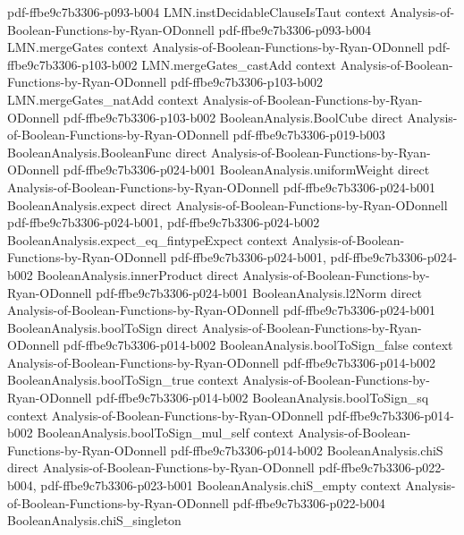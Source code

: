 \begin{lemma}
  {pdf-ffbe9c7b3306-p093-b004}
\proofstep
  {LMN.instDecidableClauseIsTaut}
  {context}
  {Analysis-of-Boolean-Functions-by-Ryan-ODonnell}
  {pdf-ffbe9c7b3306-p093-b004}
\proofstep
  {LMN.mergeGates}
  {context}
  {Analysis-of-Boolean-Functions-by-Ryan-ODonnell}
  {pdf-ffbe9c7b3306-p103-b002}
\proofstep
  {LMN.mergeGates_castAdd}
  {context}
  {Analysis-of-Boolean-Functions-by-Ryan-ODonnell}
  {pdf-ffbe9c7b3306-p103-b002}
\proofstep
  {LMN.mergeGates_natAdd}
  {context}
  {Analysis-of-Boolean-Functions-by-Ryan-ODonnell}
  {pdf-ffbe9c7b3306-p103-b002}
\proofstep
  {BooleanAnalysis.BoolCube}
  {direct}
  {Analysis-of-Boolean-Functions-by-Ryan-ODonnell}
  {pdf-ffbe9c7b3306-p019-b003}
\proofstep
  {BooleanAnalysis.BooleanFunc}
  {direct}
  {Analysis-of-Boolean-Functions-by-Ryan-ODonnell}
  {pdf-ffbe9c7b3306-p024-b001}
\proofstep
  {BooleanAnalysis.uniformWeight}
  {direct}
  {Analysis-of-Boolean-Functions-by-Ryan-ODonnell}
  {pdf-ffbe9c7b3306-p024-b001}
\proofstep
  {BooleanAnalysis.expect}
  {direct}
  {Analysis-of-Boolean-Functions-by-Ryan-ODonnell}
  {pdf-ffbe9c7b3306-p024-b001,
    pdf-ffbe9c7b3306-p024-b002}
\proofstep
  {BooleanAnalysis.expect_eq_fintypeExpect}
  {context}
  {Analysis-of-Boolean-Functions-by-Ryan-ODonnell}
  {pdf-ffbe9c7b3306-p024-b001,
    pdf-ffbe9c7b3306-p024-b002}
\proofstep
  {BooleanAnalysis.innerProduct}
  {direct}
  {Analysis-of-Boolean-Functions-by-Ryan-ODonnell}
  {pdf-ffbe9c7b3306-p024-b001}
\proofstep
  {BooleanAnalysis.l2Norm}
  {direct}
  {Analysis-of-Boolean-Functions-by-Ryan-ODonnell}
  {pdf-ffbe9c7b3306-p024-b001}
\proofstep
  {BooleanAnalysis.boolToSign}
  {direct}
  {Analysis-of-Boolean-Functions-by-Ryan-ODonnell}
  {pdf-ffbe9c7b3306-p014-b002}
\proofstep
  {BooleanAnalysis.boolToSign_false}
  {context}
  {Analysis-of-Boolean-Functions-by-Ryan-ODonnell}
  {pdf-ffbe9c7b3306-p014-b002}
\proofstep
  {BooleanAnalysis.boolToSign_true}
  {context}
  {Analysis-of-Boolean-Functions-by-Ryan-ODonnell}
  {pdf-ffbe9c7b3306-p014-b002}
\proofstep
  {BooleanAnalysis.boolToSign_sq}
  {context}
  {Analysis-of-Boolean-Functions-by-Ryan-ODonnell}
  {pdf-ffbe9c7b3306-p014-b002}
\proofstep
  {BooleanAnalysis.boolToSign_mul_self}
  {context}
  {Analysis-of-Boolean-Functions-by-Ryan-ODonnell}
  {pdf-ffbe9c7b3306-p014-b002}
\proofstep
  {BooleanAnalysis.chiS}
  {direct}
  {Analysis-of-Boolean-Functions-by-Ryan-ODonnell}
  {pdf-ffbe9c7b3306-p022-b004,
    pdf-ffbe9c7b3306-p023-b001}
\proofstep
  {BooleanAnalysis.chiS_empty}
  {context}
  {Analysis-of-Boolean-Functions-by-Ryan-ODonnell}
  {pdf-ffbe9c7b3306-p022-b004}
\proofstep
  {BooleanAnalysis.chiS_singleton}

\end{lemma}
